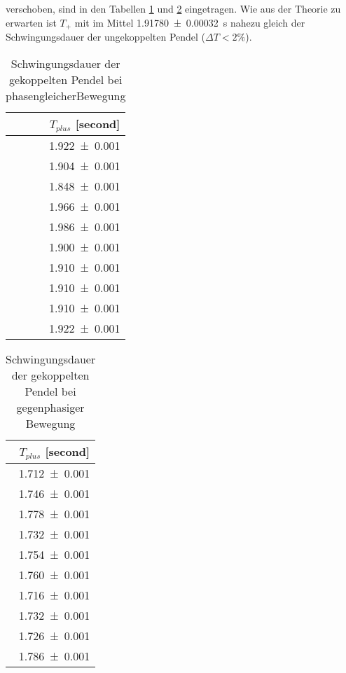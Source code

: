 verschoben, sind in den Tabellen \ref{tab:l1t+} und \ref{tab:l1t-}
eingetragen. Wie aus der Theorie zu erwarten ist $T_+$ mit im
Mittel \SI{1.91780+-0.00032}{\second} nahezu gleich der Schwingungsdauer
der ungekoppelten Pendel ($\Delta T < 2\%$).
\begin{table}
 \noindent
 \centering
 \caption{Schwingungsdauer der gekoppelten
 Pendel bei phasengleicherBewegung}
 \label{tab:l1t+}
 \begin{tabular}{r}
 \toprule
  {$T_{plus}$ [\si{second}]} \\
 \midrule
    \num{1.922 +- 0.001}\\
    \num{1.904 +- 0.001}\\
    \num{1.848 +- 0.001}\\
    \num{1.966 +- 0.001}\\
    \num{1.986 +- 0.001}\\
    \num{1.900 +- 0.001}\\
    \num{1.910 +- 0.001}\\
    \num{1.910 +- 0.001}\\
    \num{1.910 +- 0.001}\\
    \num{1.922 +- 0.001}\\
 \bottomrule
 \end{tabular}
\end{table}

\begin{table}
 \noindent
 \centering
 \caption{Schwingungsdauer der gekoppelten
 Pendel bei gegenphasiger Bewegung}
 \label{tab:l1t-}
 \begin{tabular}{r}
 \toprule
  {$T_{plus}$ [\si{second}]} \\
 \midrule
    \num{1.712 +- 0.001}\\
    \num{1.746 +- 0.001}\\
    \num{1.778 +- 0.001}\\
    \num{1.732 +- 0.001}\\
    \num{1.754 +- 0.001}\\
    \num{1.760 +- 0.001}\\
    \num{1.716 +- 0.001}\\
    \num{1.732 +- 0.001}\\
    \num{1.726 +- 0.001}\\
    \num{1.786 +- 0.001}\\
 \bottomrule
 \end{tabular}
\end{table}

